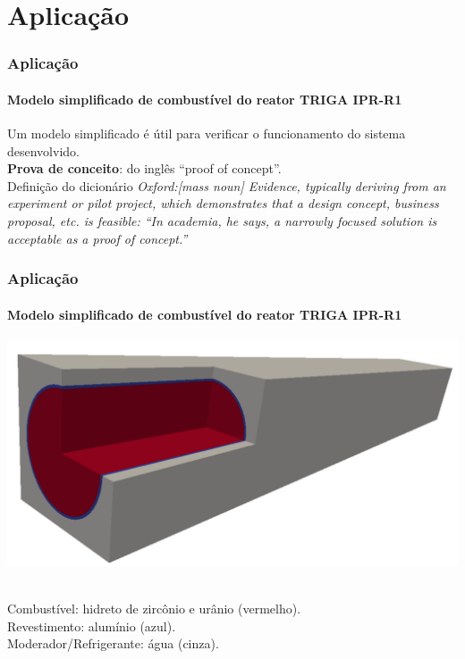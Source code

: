 \documentclass[svgnames,smaller,table]{beamer}
\begin{document}
\section{Aplicação}
\begin{frame}
  \frametitle{Aplicação}
  \framesubtitle{Modelo \textbf{simplificado} de combustível do reator TRIGA IPR-R1}
  \vspace{0.2cm}
  \raggedright
  Um modelo simplificado é útil para verificar o funcionamento do sistema desenvolvido.
  \\
  \vspace{0.2cm}
  \textbf{Prova de conceito}: do inglês ``proof of concept''.
  \\
  \vspace{0.2cm}
  Definição do dicionário \textit{Oxford:[mass noun] Evidence, typically deriving from an experiment or pilot project, which demonstrates that a design concept, business proposal, etc. is feasible: ``In academia, he says, a narrowly focused solution is acceptable as a proof of concept.''}
\end{frame}

\begin{frame}
  \frametitle{Aplicação}
  \framesubtitle{Modelo \textbf{simplificado} de combustível do reator TRIGA IPR-R1}
  \centering\includegraphics[scale=0.4]{../figuras/all_regions_isometric.png}
  \vspace{0.2cm}
  \raggedright
  \\
  Combustível: hidreto de zircônio e urânio (vermelho).
  \\
  Revestimento: alumínio (azul).
  \\
  Moderador/Refrigerante: água (cinza).
\end{frame}
\end{document}

